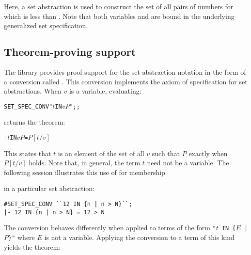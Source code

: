 \noindent Here, a set abstraction is used to construct the set of all pairs of
numbers  for which  is less than .  Note that both
variables  and  are bound in the underlying generalized set
specification.

\subsection{Theorem-proving support}

The  library provides proof support for the set abstraction
notation in the form of a conversion called .  This
conversion implements the axiom of specification for set abstractions.%
When $v$ is a variable, evaluating:

\begin{hol}\def\m#1{\mbox{\small$#1$}}
\begin{alltt}
   SET_SPEC_CONV "\m{t} IN \lb\m{v} \vb \m{P}\rb";;
\end{alltt}\end{hol}

\noindent returns the theorem:

\begin{hol}\def\m#1{\mbox{\small$#1$}}
\begin{alltt}
   {\vb}- \m{t} IN \lb\m{v} \vb \m{P}\rb = \m{P[t/v]}
\end{alltt}\end{hol}

\noindent This states that $t$ is an element of the set of all $v$ such that
$P$ exactly when $P[t/v]$ holds. Note that, in general, the term $t$ need not
be a variable. The following session illustrates this use of
 for membership {\samepage in a particular set abstraction:

\setcounter{sessioncount}{1}
\begin{session}
\begin{verbatim}
#SET_SPEC_CONV ``12 IN {n | n > N}``;
|- 12 IN {n | n > N} = 12 > N
\end{verbatim}\end{session}}

\pagebreak[3]

The conversion  behaves differently when applied to terms
of the form {\small\verb!"!$t$\verb! IN {!$E$\verb! | !$P$\verb!}"!} where
{\small $E$} is not a variable.  Applying the conversion to a term of this kind
yields the theorem:

